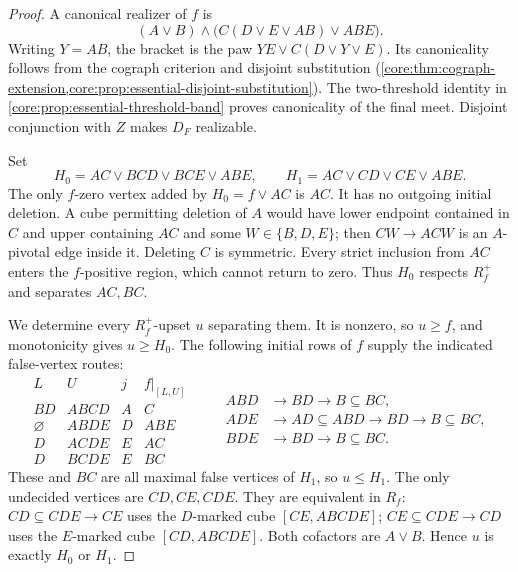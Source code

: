 \begin{proof}
A canonical realizer of $f$ is
\[
 (A\vee B)\wedge\bigl(C(D\vee E\vee AB)\vee ABE\bigr).
\]
Writing $Y=AB$, the bracket is the paw $YE\vee C(D\vee Y\vee E)$.
Its canonicality follows from the cograph criterion and disjoint substitution
(\cref{core:thm:cograph-extension,core:prop:essential-disjoint-substitution}).
The two-threshold identity in \cref{core:prop:essential-threshold-band}
proves canonicality of the final meet. Disjoint conjunction with $Z$
makes $D_F$ realizable.

Set
\[
 H_0=AC\vee BCD\vee BCE\vee ABE,
 \qquad H_1=AC\vee CD\vee CE\vee ABE.
\]
The only $f$-zero vertex added by $H_0=f\vee AC$ is $AC$.
It has no outgoing initial deletion. A cube permitting deletion of $A$
would have lower endpoint contained in $C$ and upper containing $AC$ and
some $W\in\{B,D,E\}$; then $CW\to ACW$ is an $A$-pivotal edge inside it.
Deleting $C$ is symmetric. Every strict inclusion from $AC$ enters the
$f$-positive region, which cannot return to zero. Thus $H_0$ respects
$R_f^+$ and separates $AC,BC$.

We determine every $R_f^+$-upset $u$ separating them. It is nonzero,
so $u\geq f$, and monotonicity gives $u\geq H_0$. The following initial
rows of $f$ supply the indicated false-vertex routes:
\[
\begin{array}{c|c|c|c}
 L&U&j&f|_{[L,U]}\\\hline
 BD&ABCD&A&C\\
 \varnothing&ABDE&D&ABE\\
 D&ACDE&E&AC\\
 D&BCDE&E&BC
\end{array}
\qquad
\begin{aligned}
 ABD&\to BD\to B\subseteq BC,\\
 ADE&\to AD\subseteq ABD\to BD\to B\subseteq BC,\\
 BDE&\to BD\to B\subseteq BC.
\end{aligned}
\]
These and $BC$ are all maximal false vertices of $H_1$, so $u\leq H_1$.
The only undecided vertices are $CD,CE,CDE$. They are equivalent in $R_f$:
$CD\subseteq CDE\to CE$ uses the $D$-marked cube $[CE,ABCDE]$;
$CE\subseteq CDE\to CD$ uses the $E$-marked cube $[CD,ABCDE]$.
Both cofactors are $A\vee B$. Hence $u$ is exactly $H_0$ or $H_1$.


\end{proof}
